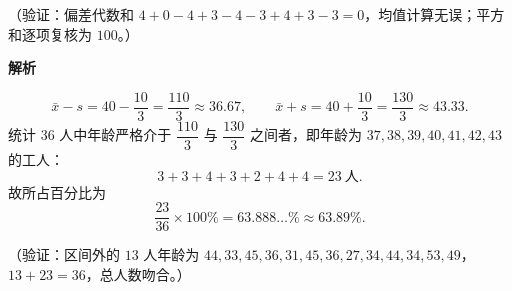 \begin{answer}
（验证：偏差代数和 \(4+0-4+3-4-3+4+3-3=0\)，均值计算无误；平方和逐项复核为 \(100\)。）


\textbf{解析}

\nopagebreak[4]
\[
\bar{x}-s=40-\frac{10}{3}=\frac{110}{3}\approx36.67,\qquad
\bar{x}+s=40+\frac{10}{3}=\frac{130}{3}\approx43.33.
\]
统计 \(36\) 人中年龄严格介于 \(\dfrac{110}{3}\) 与 \(\dfrac{130}{3}\) 之间者，即年龄为 \(37,38,39,40,41,42,43\) 的工人：
\nopagebreak[4]
\[
3+3+4+3+2+4+4=23\ \text{人}.
\]
故所占百分比为
\nopagebreak[4]
\[
\frac{23}{36}\times100\%=63.888\ldots\%\approx63.89\%.
\]

（验证：区间外的 \(13\) 人年龄为 \(44,33,45,36,31,45,36,27,34,44,34,53,49\)，\(13+23=36\)，总人数吻合。）




\end{answer}
